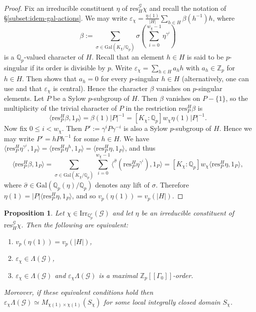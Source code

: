 \documentclass[12pt]{amsart}
\theoremstyle{plain}
\newtheorem{prop}[theorem]{Proposition}
\theoremstyle{remark}
\theoremstyle{definition}
\numberwithin{equation}{section}
\begin{document}
\begin{proof}
Fix an irreducible constituent $\eta$ of ${\mathrm{res}}^{\mathcal{G}}_{H} \chi$ and recall the notation of \S \ref{subset:idem-gal-actions}.
We may write $\varepsilon_{\chi} = \frac{\eta(1)}{|H|} \sum_{h \in H} \beta(h^{-1}) h$, where
\[
\beta := \sum_{\sigma \in {\mathrm{Gal}}(K_{\chi} / {\mathbb{Q}}_{p})} \sigma \left( \sum_{i=0}^{w_{\chi}-1} \eta^{\gamma^{i}} \right)
\]
is a ${\mathbb{Q}}_{p}$-valued character of $H$.
Recall that an element $h \in H$ is said to be $p$-singular if its order is divisible by $p$.
Write $\varepsilon_{\chi} = \sum_{h \in H} a_{h} h$ with $a_{h} \in {\mathbb{Z}}_{p}$ for $h \in H$.
Then \cite[Proposition 5]{MR1261587} shows that $a_{h}=0$ for every $p$-singular $h \in H$
(alternatively, one can use \cite[Proposition 3]{MR1261587} and that $\varepsilon_{\chi}$ is central).
Hence the character $\beta$ vanishes on $p$-singular elements.
Let $P$ be a Sylow $p$-subgroup of $H$.
Then $\beta$ vanishes on $P- \{1\}$, so the multiplicity of the trivial character of $P$ in the restriction ${\mathrm{res}}^{H}_{P} \beta$ is
\[
\langle {\mathrm{res}}^{H}_{P} \beta , 1_{P} \rangle = \beta(1) |P|^{-1} = [K_{\chi} : {\mathbb{Q}}_{p}] w_{\chi} \eta(1)|P|^{-1}.
\]
Now fix $0 \leq i < w_{\chi}$. Then $P' := \gamma^{i} P \gamma^{-i}$ is also a Sylow $p$-subgroup of $H$. Hence we may write $P' = hPh^{-1}$ for some $h \in H$.
We have
$\langle {\mathrm{res}}^{H}_{P} \eta^{\gamma^{i}} , 1_{P} \rangle = \langle {\mathrm{res}}^{H}_{P} \eta^{h} , 1_{P} \rangle = \langle {\mathrm{res}}^{H}_{P} \eta , 1_{P} \rangle$,
and thus
\[
\langle {\mathrm{res}}^{H}_{P} \beta, 1_{P} \rangle
= \sum_{\sigma \in {\mathrm{Gal}}(K_{\chi} / {\mathbb{Q}}_{p})} \sum_{i=0}^{w_{\chi}-1} \langle ^{\hat{\sigma}}({\mathrm{res}}^{H}_{P}\eta^{\gamma^{i}}), 1_{P} \rangle
= [K_{\chi} : {\mathbb{Q}}_{p}] w_{\chi}  \langle {\mathrm{res}}^{H}_{P} \eta , 1_{P} \rangle,
\]
where $\hat \sigma \in {\mathrm{Gal}}({\mathbb{Q}}_{p}(\eta) / {\mathbb{Q}}_{p})$ denotes any lift of $\sigma$.
Therefore $\eta(1) = |P| \langle {\mathrm{res}}^{H}_{P} \eta , 1_{P} \rangle$, and so $v_{p}(\eta(1))=v_{p}(|H|)$.
\end{proof}

\begin{prop}\label{prop:varep-comp-TFAE}
Let $\chi \in {\mathrm{Irr}}_{{\mathbb{Q}}_{p}^{c}}(\mathcal{G})$ and let $\eta$ be an irreducible constituent of
${\mathrm{res}}^{\mathcal{G}}_{H} \chi$. Then the following are equivalent:
\begin{enumerate}
\item $v_{p}(\eta(1))=v_{p}(|H|)$,
\item $\varepsilon_{\chi} \in \Lambda(\mathcal{G})$,
\item $\varepsilon_{\chi} \in \Lambda(\mathcal{G})$ and $\varepsilon_{\chi}\Lambda(\mathcal{G})$
is a maximal ${\mathbb{Z}}_{p}[[\Gamma_{0}]]$-order.
\end{enumerate}
Moreover, if these equivalent conditions hold then
$\varepsilon_{\chi}\Lambda(\mathcal{G}) \simeq M_{\chi(1) \times \chi(1)}(S_{\chi})$
for some local integrally closed domain $S_{\chi}$.
\end{prop}
\end{document}

